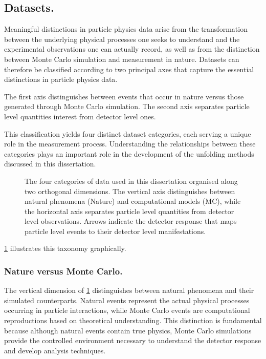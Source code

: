 \subsection{Datasets.}
    Meaningful distinctions in particle physics data arise from the transformation between the underlying physical processes one seeks to understand and the experimental observations one can actually record, as well as from the distinction between Monte Carlo simulation and measurement in nature.
    Datasets can therefore be classified according to two principal axes that capture the essential distinctions in particle physics data.
    
    The first axis distinguishes between events that occur in nature versus those generated through Monte Carlo simulation.
    The second axis separates particle level quantities interest from detector level ones.

    This classification yields four distinct dataset categories, each serving a unique role in the measurement process.
    Understanding the relationships between these categories plays an important role in the development of the unfolding methods discussed in this dissertation.
    \begin{figure}
    \centering
    \resizebox{0.7\linewidth}{!}{}
    \caption[Taxonomy of datasets used]{The four categories of data used in this dissertation organised along two orthogonal dimensions.
    The vertical axis distinguishes between natural phenomena (Nature) and computational models (MC), while the horizontal axis separates particle level quantities from detector level observations.
    Arrows indicate the detector response that maps particle level events to their detector level manifestations.
    }
    \label{fig:dataset-taxonomy}
    \end{figure}

\cref{fig:dataset-taxonomy} illustrates this taxonomy graphically.

    \subsubsection{Nature versus Monte Carlo.}
        The vertical dimension of \cref{fig:dataset-taxonomy} distinguishes between natural phenomena and their simulated counterparts.
        Natural events represent the actual physical processes occurring in particle interactions, while Monte Carlo events are computational reproductions based on theoretical understanding.
        This distinction is fundamental because although natural events contain true physics, Monte Carlo simulations provide the controlled environment necessary to understand the detector response and develop analysis techniques.

